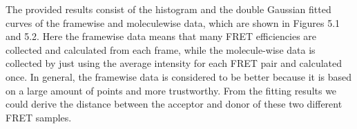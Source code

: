 \documentclass[a4paper,english,12pt,bibliography=totoc]{scrreprt}
\begin{document}

The provided results consist of the histogram and the double Gaussian fitted curves of the framewise and moleculewise data, which are shown in Figures 5.1 and 5.2. Here the framewise data means that many FRET efficiencies are collected and calculated from each frame, while the molecule-wise data is collected by just using the average intensity for each FRET pair and calculated once. In general, the framewise data is considered to be better because it is based on a large amount of points and more trustworthy. From the fitting results we could derive the distance between the acceptor and donor of these two different FRET samples.
\end{document}
